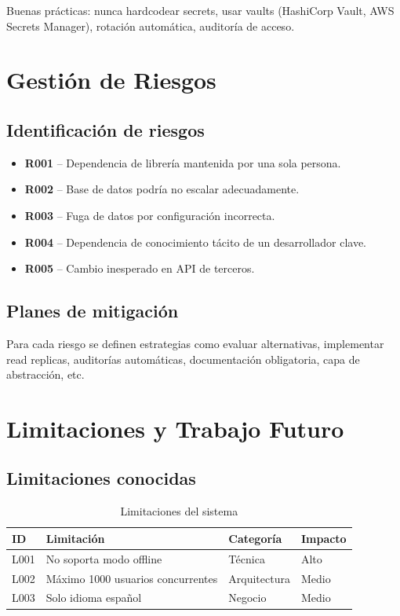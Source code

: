 \documentclass[a4paper,11pt,spanish]{article}
\begin{document}
Buenas prácticas: nunca hardcodear secrets, usar vaults (HashiCorp Vault, AWS Secrets Manager), rotación automática, auditoría de acceso.

\newpage

\section{Gestión de Riesgos}

\subsection{Identificación de riesgos}

\begin{itemize}
    \item \textbf{R001} -- Dependencia de librería mantenida por una sola persona.
    \item \textbf{R002} -- Base de datos podría no escalar adecuadamente.
    \item \textbf{R003} -- Fuga de datos por configuración incorrecta.
    \item \textbf{R004} -- Dependencia de conocimiento tácito de un desarrollador clave.
    \item \textbf{R005} -- Cambio inesperado en API de terceros.
\end{itemize}

\subsection{Planes de mitigación}

Para cada riesgo se definen estrategias como evaluar alternativas, implementar read replicas, auditorías automáticas, documentación obligatoria, capa de abstracción, etc.

\newpage

\section{Limitaciones y Trabajo Futuro}

\subsection{Limitaciones conocidas}

\begin{table}[H]
\centering
\caption{Limitaciones del sistema}
\label{tab:limitaciones}
\begin{tabular}{@{}llll@{}}
\toprule
\textbf{ID} & \textbf{Limitación} & \textbf{Categoría} & \textbf{Impacto} \\
\midrule
L001 & No soporta modo offline & Técnica & Alto \\
L002 & Máximo 1000 usuarios concurrentes & Arquitectura & Medio \\
L003 & Solo idioma español & Negocio & Medio \\
\bottomrule
\end{tabular}
\end{table}
\end{document}
